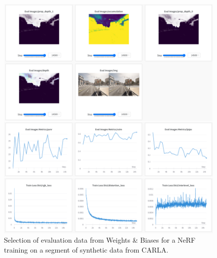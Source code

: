 \begin{figure}[h]
    \centering
    \includegraphics[width=1.0\textwidth]{figures/wandb-eval-data.png}
    \caption{Selection of evaluation data from Weights \& Biases \cite{wandb} for a NeRF training on a segment of synthetic data from CARLA.}
    \label{fig:wandb-eval-data}
\end{figure}